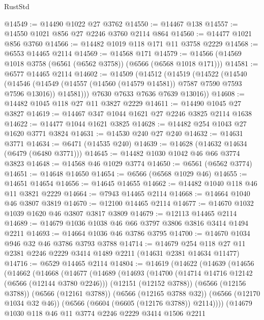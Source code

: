 \begin{lexlean}{RustStd}
\begin{coremodule}
{\begin{coremodule}
{{{{{{{{{{{{{{{{{{{{{{{{{{@14549 := @14490 @1022 @27 @3762
@14550 := @14467 @138
@14557 := @14550 @1021 @856 @27 @2246 @3760 @2114 @864
@14560 := @14477 @1021 @856 @3760
@14566 := @14482 @1019 @118 @171 @11 @3758 @2229
@14568 := @6553 @14465 @2114
@14569 := @14568 @171
@14579 := @14566 (@14569 @1018 @3758 (@6561 (@6562 @3758)) (@6566 (@6568 @1018 @171)))
@14581 := @6577 @14465 @2114
@14602 := @14509
    (@14512
      (@14519
        (@14522
          (@14540
            (@14546
              (@14549 (@14557 (@14560 (@14579 @14581)) @7587 @7590 @7593 @7596 @13016))
              @14581)))
        @7630
        @7633
        @7636
        @7639
        @13016))
@14608 := @14482 @1045 @118 @27 @11 @3827 @2229
@14611 := @14490 @1045 @27 @3827
@14619 := @14467 @347 @1044 @1621 @27 @2246 @3825 @2114 @1638
@14622 := @14477 @1044 @1621 @3825
@14628 := @14482 @254 @1043 @27 @1620 @3771 @3824
@14631 := @14530 @240 @27 @240
@14632 := @14631 @3771
@14634 := @6471 (@14535 @240)
@14639 := @14628 (@14632 @14634 (@6479 (@6480 @3771)))
@14645 := @14482 @1030 @1042 @46 @66 @3774 @3823
@14648 := @14568 @46 @1029 @3774
@14650 := @6561 (@6562 @3774)
@14651 := @14648 @14650
@14654 := @6566 (@6568 @1029 @46)
@14655 := @14651 @14654
@14656 := @14645 @14655
@14662 := @14482 @1040 @118 @46 @11 @3821 @2229
@14664 := @7943 @14465 @2114
@14668 := @14664 @1040 @46 @3807 @3819
@14670 := @12100 @14465 @2114
@14677 := @14670 @1032 @1039 @1620 @46 @3807 @3817 @3809
@14679 := @12113 @14465 @2114
@14689 := @14679 @1036 @1038 @46 @66 @3797 @3806 @3816 @3414 @1494 @2211
@14693 := @14664 @1036 @46 @3786 @3795
@14700 := @14670 @1034 @946 @32 @46 @3786 @3793 @3788
@14714 := @14679 @254 @118 @27 @11 @2381 @2246 @2229 @3414 @1489 @2211 (@14631 @2381 @14634 @11477)
@14716 := @6529 @14465 @2114
@14804 := @14619
    (@14622
      (@14639
        (@14656
          (@14662
            (@14668
              (@14677
                (@14689
                  (@14693
                    (@14700
                      (@14714 @14716 @12142 (@6566 (@12144 @3780 @2246)))
                      (@12151 (@12152 @3788))
                      (@6566 (@12156 @3788))
                      (@6566 (@12161 @3788))
                      (@6566 (@12165 @3788 @32))
                      (@6566 (@12170 @1034 @32 @46))
                      (@6566 (@6604 (@6605 (@12176 @3788)) @2114))))
                  (@14679
                    @1030
                    @118
                    @46
                    @11
                    @3774
                    @2246
                    @2229
                    @3414
                    @1506
                    @2211
}}}}}}}}}}}}}}}}}}}}}}}}}}
\end{coremodule}}
\end{coremodule}
\end{lexlean}
